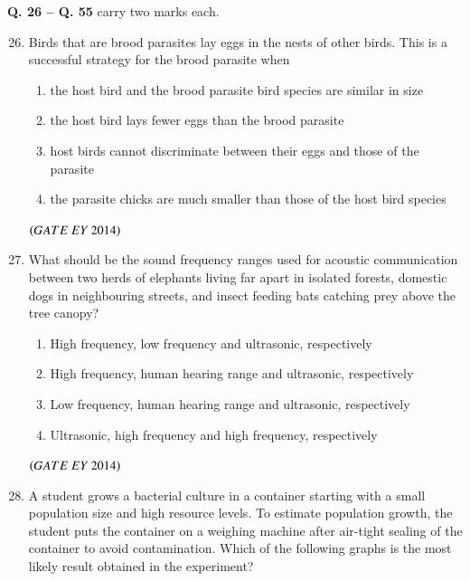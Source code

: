 \documentclass[journal]{IEEEtran}
\numberwithin{equation}{enumi}
\numberwithin{figure}{enumi}
\begin{document}
\noindent \textbf{Q. 26 -- Q. 55} carry two marks each.
\begin{enumerate}
\setcounter{enumi}{25}

    \item Birds that are brood parasites lay eggs in the nests of other birds. This is a successful strategy for the brood parasite when
    \begin{enumerate}
        \item the host bird and the brood parasite bird species are similar in size
        \item the host bird lays fewer eggs than the brood parasite
        \item host birds cannot discriminate between their eggs and those of the parasite
        \item the parasite chicks are much smaller than those of the host bird species
    \end{enumerate}
    \hfill{$\brak{ GATE\ EY\ 2014}$}
    \bigskip

    \item What should be the sound frequency ranges used for acoustic communication between two herds of elephants living far apart in isolated forests, domestic dogs in neighbouring streets, and insect feeding bats catching prey above the tree canopy?
    \begin{enumerate}
        \item High frequency, low frequency and ultrasonic, respectively
        \item High frequency, human hearing range and ultrasonic, respectively
        \item Low frequency, human hearing range and ultrasonic, respectively
        \item Ultrasonic, high frequency and high frequency, respectively
    \end{enumerate}
    \hfill{$\brak{ GATE\ EY\ 2014}$}
    \bigskip

    \item A student grows a bacterial culture in a container starting with a small population size and high resource levels. To estimate population growth, the student puts the container on a weighing machine after air-tight sealing of the container to avoid contamination. Which of the following graphs is the most likely result obtained in the experiment?
    

\end{enumerate}
\end{document}
